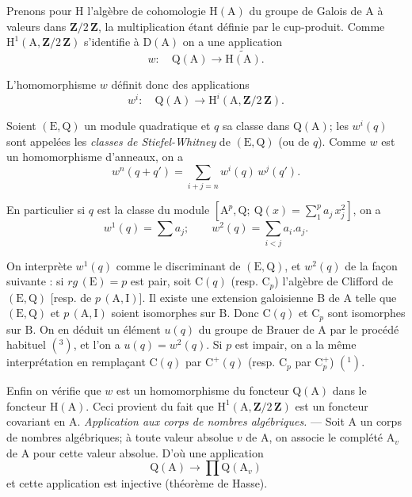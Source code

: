 Prenons pour $\mathrm H$ l'algèbre de cohomologie $\mathrm H(\mathrm A)$ du groupe de Galois de $\mathrm A$ à valeurs dans $\mathbf Z/2\,\mathbf Z$, la multiplication étant définie par le cup-produit. Comme $\mathrm H^{1}(\mathrm A,\mathbf Z/2\,\mathbf Z)$ s'identifie à $\mathrm D(\mathrm A)$ on a une application
\[
w:\quad\mathrm Q(\mathrm A)\to\widetilde{\mathrm H(\mathrm A)}.
\]

L'homomorphisme $w$ définit donc des applications
\[
w^{i}:\quad\mathrm Q(\mathrm A)\to\mathrm H^{i}(\mathrm A,\mathbf Z/2\,\mathbf Z).
\]

Soient $(\mathrm E,\mathrm Q)$ un module quadratique et $q$ sa classe dans $\mathrm Q(\mathrm A)$; les $w^{i}(q)$ sont appelées les \emph{classes de Stiefel-Whitney} de $(\mathrm E,\mathrm Q)$ (ou de $q$). Comme $w$ est un homomorphisme d'anneaux, on a
\[
w^{n}(q+q')=\sum_{i+j=n}w^{i}(q)\,w^{j}(q').
\]

En particulier si $q$ est la classe du module $\left[\mathrm A^{p},\mathrm Q;\ \mathrm Q(x)=\displaystyle\sum_{1}^{p}a_{j}\,x_{j}^{2}\right]$, on a
\[
w^{1}(q)=\sum a_{j};\qquad w^{2}(q)=\sum_{i<j}a_{i}.a_{j}.
\]

On interprète $w^{1}(q)$ comme le discriminant de $(\mathrm E,\mathrm Q)$, et $w^{2}(q)$ de la façon suivante : si $rg\,(\mathrm E)=p$ est pair, soit $\mathrm C(q)$ (resp. $\mathrm C_{p}$) l'algèbre de Clifford de $(\mathrm E,\mathrm Q)$ [resp. de $p\,(\mathrm A,\mathrm I)$]. Il existe une extension galoisienne $\mathrm B$ de $\mathrm A$ telle que $(\mathrm E,\mathrm Q)$ et $p\,(\mathrm A,\mathrm I)$ soient isomorphes sur $\mathrm B$. Donc $\mathrm C(q)$ et $\mathrm C_{p}$ sont isomorphes sur $\mathrm B$. On en déduit un élément $u(q)$ du groupe de Brauer de $\mathrm A$ par le procédé habituel $(^{3})$, et l'on a $u(q)=w^{2}(q)$. Si $p$ est impair, on a la même interprétation en remplaçant $\mathrm C(q)$ par $\mathrm C^{+}(q)$ (resp. $\mathrm C_{p}$ par $\mathrm C_{p}^{+}$) $(^{1})$.

Enfin on vérifie que $w$ est un homomorphisme du foncteur $\mathrm Q(\mathrm A)$ dans le foncteur $\mathrm H(\mathrm A)$. Ceci provient du fait que $\mathrm H^{1}(\mathrm A,\mathbf Z/2\,\mathbf Z)$ est un foncteur covariant en $\mathrm A$.
\emph{Application aux corps de nombres algébriques.} --- Soit $\mathrm A$ un corps de nombres algébriques; à toute valeur absolue $v$ de $\mathrm A$, on associe le complété $\mathrm A_{v}$ de $\mathrm A$ pour cette valeur absolue. D'où une application
\[
\mathrm Q(\mathrm A)\to\prod\mathrm Q(\mathrm A_{v})
\]
et cette application est injective (théorème de Hasse).

